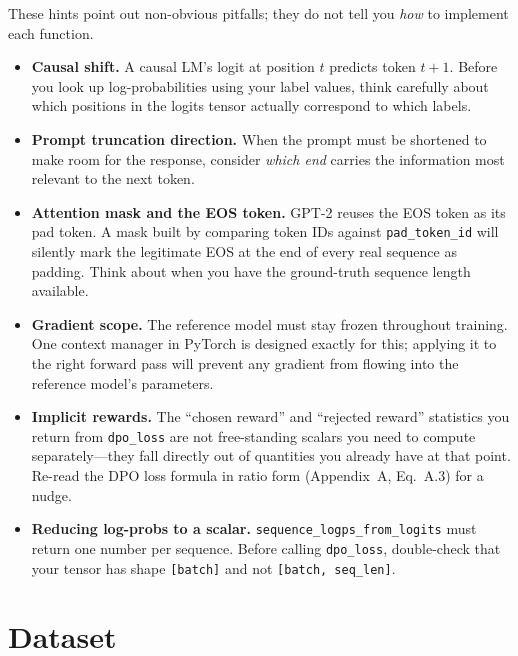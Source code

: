 \documentclass[11pt]{article}
\begin{document}
These hints point out non-obvious pitfalls; they do not tell you \emph{how} to implement each function.

\begin{itemize}[itemsep=0.45em]
    \item \textbf{Causal shift.}
    A causal LM's logit at position $t$ predicts token $t+1$.
    Before you look up log-probabilities using your label values, think carefully about
    which positions in the logits tensor actually correspond to which labels.

    \item \textbf{Prompt truncation direction.}
    When the prompt must be shortened to make room for the response, consider \emph{which
    end} carries the information most relevant to the next token.

    \item \textbf{Attention mask and the EOS token.}
    GPT-2 reuses the EOS token as its pad token.
    A mask built by comparing token IDs against \texttt{pad\_token\_id} will silently
    mark the legitimate EOS at the end of every real sequence as padding.
    Think about when you have the ground-truth sequence length available.

    \item \textbf{Gradient scope.}
    The reference model must stay frozen throughout training.
    One context manager in PyTorch is designed exactly for this; applying it to the right
    forward pass will prevent any gradient from flowing into the reference model's parameters.

    \item \textbf{Implicit rewards.}
    The ``chosen reward'' and ``rejected reward'' statistics you return from \texttt{dpo\_loss}
    are not free-standing scalars you need to compute separately---they fall directly out of
    quantities you already have at that point.  Re-read the DPO loss formula in ratio form
    (Appendix~A, Eq.~A.3) for a nudge.

    \item \textbf{Reducing log-probs to a scalar.}
    \texttt{sequence\_logps\_from\_logits} must return one number per sequence.
    Before calling \texttt{dpo\_loss}, double-check that your tensor has shape
    \texttt{[batch]} and not \texttt{[batch, seq\_len]}.
\end{itemize}

\section*{Dataset}
\end{document}
